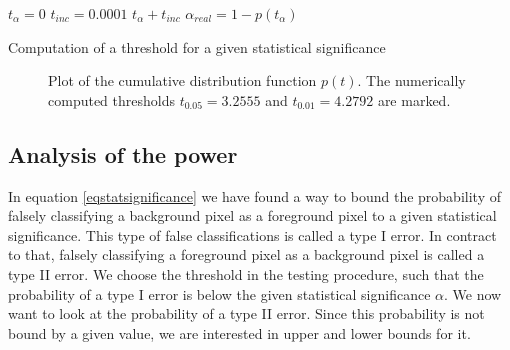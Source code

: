 \documentclass[a4paper,12pt]{article}
\theoremstyle{plain}
\theoremstyle{definition}
\begin{document}
\begin{algorithm}[H]
	$t_\alpha = 0$\;
	$t_{inc} = 0.0001$\;
	{
		$t_\alpha + t_{inc}$\;
		$\alpha_{real} = 1 - p(t_\alpha)$\;
	}
	\caption{Computation of a threshold for a given statistical significance}
\end{algorithm}

\begin{figure}[h!]
	\centering
	\caption{Plot of the cumulative distribution function $p(t)$. The numerically computed thresholds $t_{0.05} = 3.2555$ and $t_{0.01} = 4.2792$ are marked.}
	\label{figurecdf}
\end{figure}

\newpage

\subsection{Analysis of the power}\label{sectionpower}

In equation \eqref{eqstatsignificance} we have found a way to bound the probability of falsely classifying a background pixel as a foreground pixel to a given statistical significance. This type of false classifications is called a type I error. In contract to that, falsely classifying a foreground pixel as a background pixel is called a type II error. We choose the threshold in the testing procedure, such that the probability of a type I error is below the given statistical significance $\alpha$. We now want to look at the probability of a type II error. Since this probability is not bound by a given value, we are interested in upper and lower bounds for it.
\end{document}
